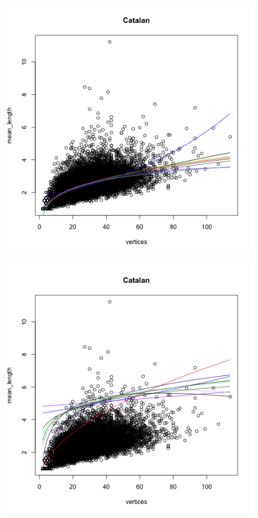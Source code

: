 \documentclass[paper=a4, fontsize=11pt]{scrartcl} %
\begin{document}
\begin{figure}
\centering
\begin{minipage}{\textwidth}
\centering
\begin{minipage}{.5\textwidth}
  \centering
  \includegraphics[width=\linewidth]{Mean_Catalan1}
  \label{fig:cat1}
\end{minipage}%
\begin{minipage}{.5\textwidth}
  \centering
  \includegraphics[width=\linewidth]{Mean_Catalan2}

\end{minipage}
\end{minipage}
\end{figure}
\end{document}
